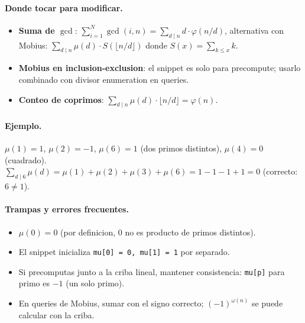\paragraph{Donde tocar para modificar.}
\begin{itemize}\setlength\itemsep{0pt}
	\item \textbf{Suma de $\gcd$}: $\sum_{i=1}^{N} \gcd(i, n) = \sum_{d \mid n} d \cdot \varphi(n/d)$, alternativa con Mobius: $\sum_{d \mid n} \mu(d) \cdot S(\lfloor n/d \rfloor)$ donde $S(x) = \sum_{k \le x} k$.
	\item \textbf{Mobius en inclusion-exclusion}: el snippet es solo para precompute; usarlo combinado con divisor enumeration en queries.
	\item \textbf{Conteo de coprimos}: $\sum_{d \mid n} \mu(d) \cdot \lfloor n/d \rfloor = \varphi(n)$.
\end{itemize}

\paragraph{Ejemplo.}
$\mu(1) = 1$, $\mu(2) = -1$, $\mu(6) = 1$ (dos primos distintos), $\mu(4) = 0$ (cuadrado). $\sum_{d \mid 6} \mu(d) = \mu(1) + \mu(2) + \mu(3) + \mu(6) = 1 - 1 - 1 + 1 = 0$ (correcto: $6 \ne 1$).

\paragraph{Trampas y errores frecuentes.}
\begin{itemize}\setlength\itemsep{0pt}
	\item $\mu(0) = 0$ (por definicion, $0$ no es producto de primos distintos).
	\item El snippet inicializa \texttt{mu[0] = 0, mu[1] = 1} por separado.
	\item Si precomputas junto a la criba lineal, mantener consistencia: \texttt{mu[p]} para primo es $-1$ (un solo primo).
	\item En queries de Mobius, sumar con el signo correcto; $(-1)^{\omega(n)}$ se puede calcular con la criba.
\end{itemize}

